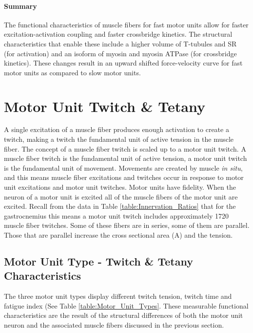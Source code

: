 \paragraph{Summary}
The functional characteristics of muscle fibers for fast motor units allow for faster excitation-activation coupling and faster crossbridge kinetics. The structural characteristics that enable these include a higher volume of T-tubules and SR (for activation) and an isoform of myosin and myosin ATPase (for crossbridge kinetics). These changes result in an upward shifted force-velocity curve for fast motor units as compared to slow motor units. 




\section{Motor Unit Twitch \& Tetany}

A single excitation of a muscle fiber produces enough activation to create a twitch, making a twitch the fundamental unit of active tension in the muscle fiber. The concept of a muscle fiber twitch is scaled up to a motor unit twitch. A muscle fiber twitch is the fundamental unit of active tension, a motor unit twitch is the fundamental unit of movement.\footnotemark{} Movements are created by muscle \textit{in situ}, and this means muscle fiber excitations and twitches occur in response to motor unit excitations and motor unit twitches. Motor units have fidelity. When the neuron of a motor unit is excited all of the muscle fibers of the motor unit are excited. Recall from the data in Table \ref{table:Innervation_Ratios} that for the gastrocnemius this means a motor unit twitch includes approximately 1720 muscle fiber twitches. Some of these fibers are in series, some of them are parallel. Those that are parallel increase the cross sectional area (A) and the tension.

\subsection{Motor Unit Type - Twitch \& Tetany Characteristics}

The three motor unit types display different twitch tension, twitch time and fatigue index (See Table \ref{table:Motor_Unit_Types}. These measurable functional characteristics are the result of the structural differences of both the motor unit neuron and the associated muscle fibers discussed in the previous section.

